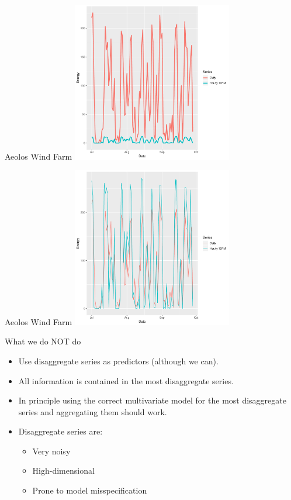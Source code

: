 \documentclass{beamer}
\begin{document}
  \begin{frame}{Aeolos Wind Farm}
  \centering
  \includegraphics[height=7cm]{Figs/Aeolos_Unscaled}
  \end{frame}
  \begin{frame}{Aeolos Wind Farm}
\centering
\includegraphics[height=7cm]{Figs/Aeolos_Scaled}
  \hfill\hyperlink{afterdat}{\beamerbutton{}}
\end{frame}
  \begin{frame}{What we do NOT do}\label{bu}
  \begin{itemize}
  	\item Use disaggregate series as predictors (although we can).
  	\item All information is contained in the most disaggregate series.
  	\item In principle using the correct multivariate model for the most disaggregate series and aggregating them should work.
  	\item Disaggregate series are: 
  	\begin{itemize}
  		\item Very noisy
  		\item High-dimensional
  		\item Prone to model misspecification
  	\end{itemize} 
  \end{itemize}
  \hfill\hyperlink{cont}{\beamerbutton{}}
  \end{frame}
\end{document}
